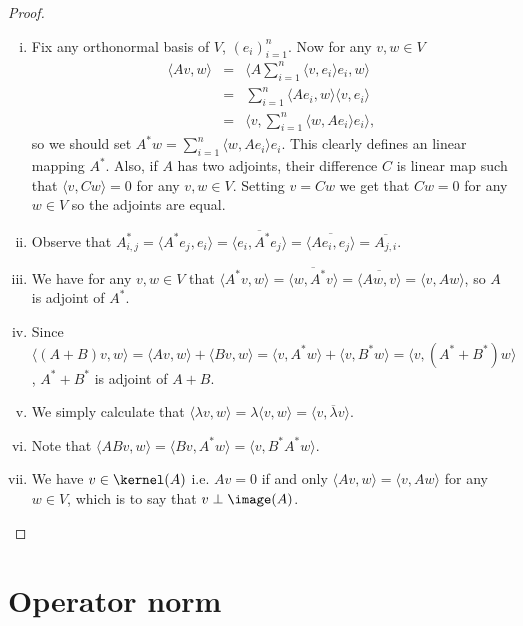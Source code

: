 \begin{proof}
	\begin{enumerate}[i)]
		\item Fix any orthonormal basis of $V$, $(e_{i})_{i = 1}^{n}$. Now for any $v, w \in V$
		\begin{eqnarray*}
			\langle A v, w \rangle &=& \langle A \sum_{i = 1}^{n} \langle v, e_{i} \rangle e_{i}, w\rangle\\
			&=& \sum_{i = 1}^{n} \langle A e_{i}, w \rangle \langle v, e_{i} \rangle \\
			&=& \langle v, \sum_{i = 1}^{n} \langle w, A e_{i} \rangle e_{i} \rangle,
		\end{eqnarray*}
		so we should set $A^{*} w = \sum_{i = 1}^{n} \langle w, A e_{i} \rangle e_{i}$. This clearly defines an linear mapping $A^{*}$. Also, if $A$ has two adjoints, their difference $C$ is linear map such that $\langle v, C w \rangle = 0$ for any $v, w \in V$. Setting $v = C w$ we get that $C w = 0$ for any $w \in V$ so the adjoints are equal.
		\item Observe that $A^{*}_{i, j} = \langle A^{*}e_{j}, e_{i} \rangle = \overline{\langle e_{i}, A^{*} e_{j} \rangle} = \overline{ \langle A e_{i}, e_{j} \rangle} = \overline{A_{j, i}}$.
		\item We have for any $v, w \in V$ that $\langle A^{*} v, w \rangle = \overline{\langle w, A^{*} v \rangle} = \overline{\langle A w, v \rangle} = \langle v, A w \rangle$, so $A$ is adjoint of $A^{*}$.
		\item Since $\langle (A + B) v, w \rangle = \langle A v, w \rangle + \langle B v, w \rangle = \langle v, A^{*} w \rangle + \langle v, B^{*} w \rangle = \langle v, (A^{*} + B^{*})w \rangle$, $A^{*} + B^{*}$ is adjoint of $A + B$.
		\item We simply calculate that $\langle \lambda v, w \rangle = \lambda \langle v, w \rangle = \langle v, \overline{\lambda} v \rangle$.
		\item Note that $\langle A B v, w \rangle = \langle B v, A^{*}w \rangle = \langle v, B^{*} A^{*} w \rangle$.
		\item We have $v \in \kernel(A)$ i.e. $A v = 0$ if and only $\langle A v, w \rangle = \langle v, A w \rangle$ for any $w \in V$, which is to say that $v \perp \image(A)$.
	\end{enumerate}
\end{proof}

\section{Operator norm}


